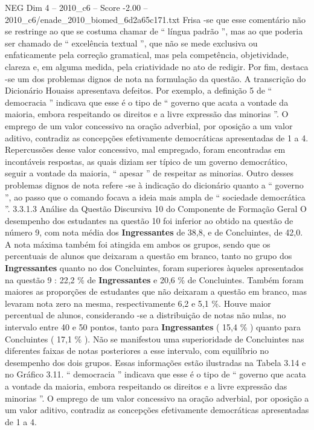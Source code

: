\begin{textsample}{NEG Dim 4 – 2010\_c6 – Score -2.00 – 2010\_c6/enade\_2010\_biomed\_6d2a65c171.txt}
Frisa -se que esse comentário não se restringe ao que se costuma chamar de “ língua padrão ”, mas ao que poderia ser chamado de “ excelência textual ”, que não se mede exclusiva ou enfaticamente pela correção gramatical, mas pela competência, objetividade, clareza e, em alguma medida, pela criatividade no ato de redigir.
Por fim, destaca -se um dos problemas dignos de nota na formulação da questão.
A transcrição do Dicionário Houaiss apresentava defeitos.
Por exemplo, a definição 5 de “ democracia ” indicava que esse é o tipo de “ governo que acata a vontade da maioria, embora respeitando os direitos e a livre expressão das minorias ”.
O emprego de um valor concessivo na oração adverbial, por oposição a um valor aditivo, contradiz as concepções efetivamente democráticas apresentadas de 1 a 4.
Repercussões desse valor concessivo, mal empregado, foram encontradas em incontáveis respostas, as quais diziam ser típico de um governo democrático, seguir a vontade da maioria, “ apesar ” de respeitar as minorias.
Outro desses problemas dignos de nota refere -se à indicação do dicionário quanto a “ governo ”, ao passo que o comando focava a ideia mais ampla de “ sociedade democrática ”. 3.3.1.3 Análise da Questão Discursiva 10 do Componente de Formação Geral O desempenho dos estudantes na questão 10 foi inferior ao obtido na questão de número 9, com nota média dos \textbf{Ingressantes} de 38,8, e de Concluintes, de 42,0.
A nota máxima também foi atingida em ambos os grupos, sendo que os percentuais de alunos que deixaram a questão em branco, tanto no grupo dos \textbf{Ingressantes} quanto no dos Concluintes, foram superiores àqueles apresentados na questão 9 : 22,2 \% de \textbf{Ingressantes} e 20,6 \% de Concluintes.
Também foram maiores as proporções de estudantes que não deixaram a questão em branco, mas levaram nota zero na mesma, respectivamente 6,2 e 5,1 \%.
Houve maior percentual de alunos, considerando -se a distribuição de notas não nulas, no intervalo entre 40 e 50 pontos, tanto para \textbf{Ingressantes} ( 15,4 \% ) quanto para Concluintes ( 17,1 \% ).
Não se manifestou uma superioridade de Concluintes nas diferentes faixas de notas posteriores a esse intervalo, com equilíbrio no desempenho dos dois grupos.
Essas informações estão ilustradas na Tabela 3.14 e no Gráfico 3.11. “ democracia ” indicava que esse é o tipo de “ governo que acata a vontade da maioria, embora respeitando os direitos e a livre expressão das minorias ”.
O emprego de um valor concessivo na oração adverbial, por oposição a um valor aditivo, contradiz as concepções efetivamente democráticas apresentadas de 1 a 4.

\end{textsample}

